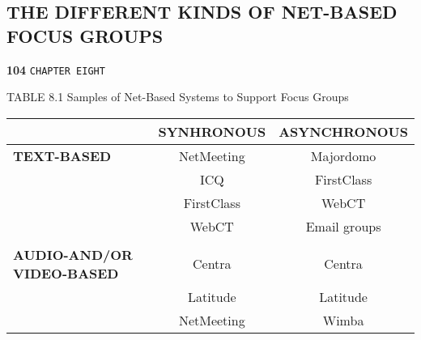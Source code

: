 \documentclass[a4,9pt]{beamer}
\begin{document}
\begin{frame}
\section*{THE DIFFERENT KINDS OF NET-BASED FOCUS GROUPS }
\begin{flushleft}
\textbf{104}\hspace*{1cm} \texttt{CHAPTER EIGHT}
\end{flushleft}

\vspace*{0.5cm}
\begin{flushleft}
TABLE 8.1 \hspace*{0.2cm} Samples of Net-Based Systems to Support Focus Groups \\
\begin{tabular}{lcc}

 \hline

 \hline

 \hline

 \hline

                                    &  \textbf{SYNHRONOUS}    & \textbf{ASYNCHRONOUS}\\
\hline
\textbf{TEXT-BASED}                 &    NetMeeting  &  Majordomo \\
                                    &     ICQ        &   FirstClass \\
                                    &    FirstClass  &  WebCT   \\
                                    &     WebCT      &  Email groups    \\
                                    &                &                  \\
\textbf{AUDIO-AND/OR VIDEO-BASED}   &    Centra      &   Centra          \\
                                    &     Latitude   &   Latitude         \\
                                    &     NetMeeting &   Wimba         \\

 \hline

 \hline

 \hline

 \hline
\end{tabular}
\end{flushleft}
\end{frame}
\end{document}
